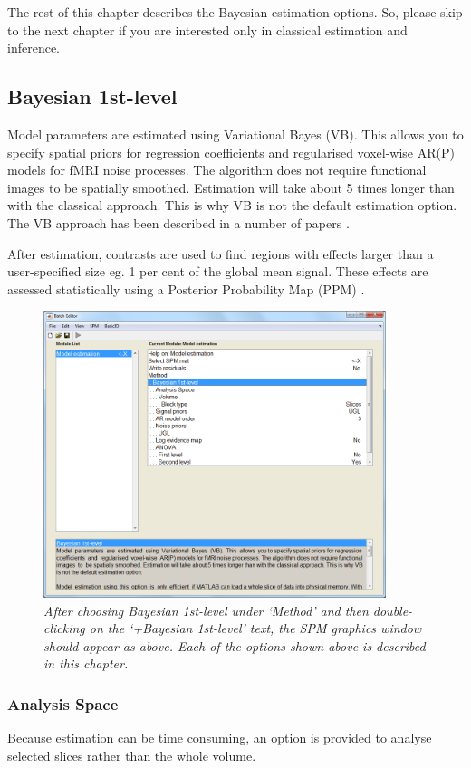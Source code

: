 \documentclass[a4paper,titlepage]{book}
\begin{document}
The rest of this chapter describes the Bayesian estimation options.
So, please skip to the next chapter if you are interested only in 
classical estimation and inference. 

\subsection{Bayesian 1st-level}
Model parameters are estimated using Variational Bayes (VB). This allows you to specify spatial priors for regression coefficients and regularised voxel-wise AR(P) models for fMRI noise processes. The algorithm does not require functional images to be spatially smoothed. Estimation will take about 5 times longer than with the classical approach. This is why VB is not the default estimation option. The VB approach has been described in a number of papers \cite{vb_fmri_ar,vb2,vb3,vb4}.
                                                          
After estimation, contrasts are used to find regions with effects larger than a user-specified size eg. 1 per cent of the global mean signal. These effects are assessed statistically using a Posterior Probability Map (PPM) \cite{karl_posterior}.

\begin{figure}
\includegraphics[width=100mm]{bayes_options}
\caption{\em After choosing Bayesian 1st-level under `Method' and then double-clicking on the `+Bayesian 1st-level' text, the SPM graphics window should appear as above. Each of the options shown above is described in this chapter. \label{bayes_options}}
\end{figure}

\subsubsection{Analysis Space}
Because estimation can be time consuming, an option is provided to analyse selected slices rather than the whole volume.
\end{document}
